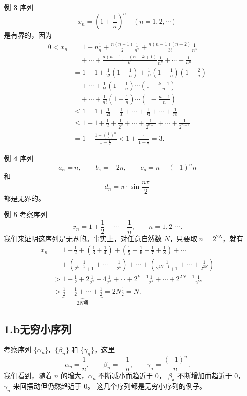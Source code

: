 \documentclass[12pt,a4paper,oneside]{ctexbook}
\begin{document}
\medskip
\textbf{例 3}\quad
序列
\[
    x_n=\left(1+\frac{1}{n}\right)^n\quad (n=1,2,\cdots)
\]
是有界的，因为
\begin{align*}
0<x_n
&=1+n\frac{1}{n}
  +\frac{n(n-1)}{2}\frac{1}{n^2}
  +\frac{n(n-1)(n-2)}{3!}\frac{1}{n^3} \\
&\quad+\cdots+
  \frac{n(n-1)\cdots(n-k+1)}{k!}\frac{1}{n^k}
  +\cdots+\frac{1}{n^n} \\
&=1+1+\frac{1}{2!}\left(1-\frac{1}{n}\right)
  +\frac{1}{3!}\left(1-\frac{1}{n}\right)\left(1-\frac{2}{n}\right)\\
&\quad+\cdots+
  \frac{1}{k!}\left(1-\frac{1}{n}\right)\cdots
  \left(1-\frac{k-1}{n}\right) \\
&\quad+\cdots+
  \frac{1}{n!}\left(1-\frac{1}{n}\right)\cdots
  \left(1-\frac{n-1}{n}\right)\\
&\le 1+1+\frac{1}{2!}+\frac{1}{3!}+\cdots+\frac{1}{k!}
  +\cdots+\frac{1}{n!}\\
&\le 1+1+\frac{1}{2}+\frac{1}{2^2}+\cdots+\frac{1}{2^{k-1}}
  +\cdots+\frac{1}{2^{n-1}}\\
&=1+\frac{1-\left(\frac12\right)^n}{1-\frac12}
  <1+\frac{1}{1-\frac12}=3.
\end{align*}

\medskip
\textbf{例 4}\quad
序列
\[
    a_n=n,\qquad b_n=-2n,\qquad c_n=n+(-1)^n n
\]
和
\[
    d_n=n\cdot\sin\frac{n\pi}{2}
\]
都是无界的。

\medskip
\textbf{例 5}\quad
考察序列
\[
    x_n=1+\frac12+\cdots+\frac1n,\qquad n=1,2,\cdots.
\]
我们来证明这序列是无界的。事实上，对任意自然数 $N$，只要取
$n=2^{2N}$，就有
\begin{align*}
x_n
&=1+\frac12+\left(\frac13+\frac14\right)
 +\left(\frac15+\frac16+\frac17+\frac18\right)+\cdots\\
&\quad+\left(\frac{1}{2^{k-1}+1}+\cdots+\frac{1}{2^k}\right)
 +\cdots+
 \left(\frac{1}{2^{2N-1}+1}+\cdots+\frac{1}{2^{2N}}\right)\\
&>1+\frac12+2\frac{1}{2^2}+4\frac{1}{2^3}
 +\cdots+2^{k-1}\frac{1}{2^k}
 +\cdots+2^{2N-1}\frac{1}{2^{2N}}\\
&>\underbrace{\frac12+\frac12+\cdots+\frac12}_{2N\text{项}}
 =2N\frac12=N.
\end{align*}

\subsection*{1.b\quad 无穷小序列}

考察序列 $\{\alpha_n\}$，$\{\beta_n\}$ 和 $\{\gamma_n\}$，这里
\[
    \alpha_n=\frac1n,\qquad
    \beta_n=-\frac1n,\qquad
    \gamma_n=\frac{(-1)^n}{n}.
\]
我们看到，随着 $n$ 的增大，$\alpha_n$ 不断减小而趋近于 $0$，
$\beta_n$ 不断增加而趋近于 $0$，
$\gamma_n$ 来回摆动但仍然趋近于 $0$。
这几个序列都是无穷小序列的例子。
\end{document}
